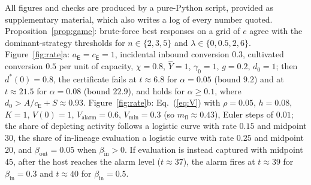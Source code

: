 \documentclass[letterpaper]{article} %
\theoremstyle{definition}
\newcommand{\dE}{\mathsf{E}}
\newcommand{\Valarm}{V_{\mathrm{alarm}}}
\newcommand{\Vmin}{V_{\min}}
\newcommand{\mfl}{m_{\mathrm{fl}}}
\begin{document}
All figures and checks are produced by a pure-Python script, provided as supplementary material, which also writes a log of every number quoted. Proposition~\ref{prop:game}: brute-force best responses on a grid of $e$ agree with the dominant-strategy thresholds for $n\in\{2,3,5\}$ and $\lambda\in\{0,0.5,2,6\}$. Figure~\ref{fig:rate}a: $a_\dE=c_\dE=1$, incidental inbound conversion $0.3$, cultivated conversion $0.5$ per unit of capacity, $\chi=0.8$, $\hat Y=1$, $\gamma_0=1$, $g=0.2$, $d_0=1$; then $d^\ast(0)=0.8$, the certificate fails at $t\approx6.8$ for $\alpha=0.05$ (bound $9.2$) and at $t\approx21.5$ for $\alpha=0.08$ (bound $22.9$), and holds for $\alpha\ge0.1$, where $d_0>A/c_\dE+S\approx0.93$. Figure~\ref{fig:rate}b: Eq.~(\ref{eq:V}) with $\rho=0.05$, $h=0.08$, $K=1$, $V(0)=1$, $\Valarm=0.6$, $\Vmin=0.3$ (so $\mfl\approx0.43$), Euler steps of $0.01$; the share of depleting activity follows a logistic curve with rate $0.15$ and midpoint $30$, the share of in-lineage evaluation a logistic curve with rate $0.25$ and midpoint $20$, and $\beta_{\mathrm{out}}=0.05$ when $\beta_{\mathrm{in}}>0$. If evaluation is instead captured with midpoint $45$, after the host reaches the alarm level ($t\approx37$), the alarm fires at $t\approx39$ for $\beta_{\mathrm{in}}=0.3$ and $t\approx40$ for $\beta_{\mathrm{in}}=0.5$.
\end{document}
